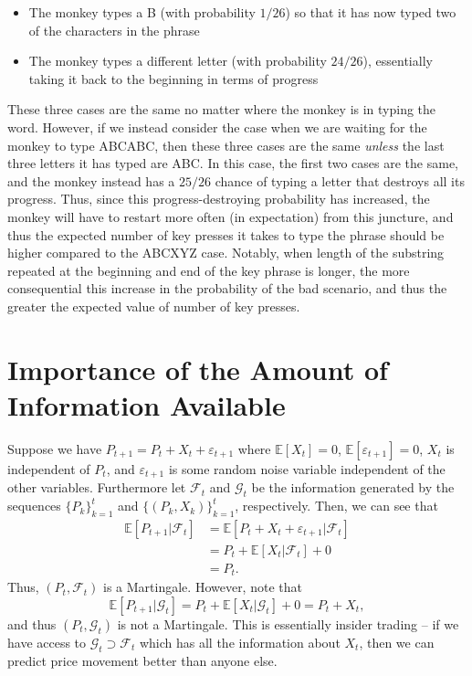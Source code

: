 {\begin{itemize}
		\item The monkey types a B (with probability $1/26$) so that it has now typed two of the characters in the phrase
		\item The monkey types a different letter (with probability $24/26$), essentially taking it back to the beginning in terms of progress
	\end{itemize} These three cases are the same no matter where the monkey is in typing the word. However, if we instead consider the case when we are waiting for the monkey to type ABCABC, then these three cases are the same \textit{unless} the last three letters it has typed are ABC. In this case, the first two cases are the same, and the monkey instead has a $25/26$ chance of typing a letter that destroys all its progress. Thus, since this progress-destroying probability has increased, the monkey will have to restart more often (in expectation) from this juncture, and thus the expected number of key presses it takes to type the phrase should be higher compared to the ABCXYZ case. Notably, when length of the substring repeated at the beginning and end of the key phrase is longer, the more consequential this increase in the probability of the bad scenario, and thus the greater the expected value of number of key presses.
}

\section{Importance of the Amount of Information Available}
Suppose we have $P_{t+1}=P_t+X_t+\varepsilon_{t+1}$ where $\mathbb E[X_t]=0$, $\mathbb E[\varepsilon_{t+1}]=0$, $X_t$ is independent of $P_t$, and $\varepsilon_{t+1}$ is some random noise variable independent of the other variables. Furthermore let $\mathcal F_t$ and $\mathcal G_t$ be the information generated by the sequences $\{P_k\}_{k=1}^t$ and $\{(P_k,X_k)\}_{k=1}^t$, respectively. Then, we can see that \begin{align*}
	\mathbb E[P_{t+1}|\mathcal F_t] &= \mathbb E[P_t+X_t+\varepsilon_{t+1}|\mathcal F_t] \\
									&= P_t + \mathbb E[X_t|\mathcal F_t] + 0 \\
									&= P_t.
\end{align*} Thus, $(P_t,\mathcal F_t)$ is a Martingale. However, note that $$\mathbb E[P_{t+1}|\mathcal G_t] = P_t + \mathbb E[X_t|\mathcal G_t] + 0 = P_t + X_t,$$ and thus $(P_t,\mathcal G_t)$ is not a Martingale. This is essentially insider trading -- if we have access to $\mathcal G_t\supset \mathcal F_t$ which has all the information about $X_t$, then we can predict price movement better than anyone else.

